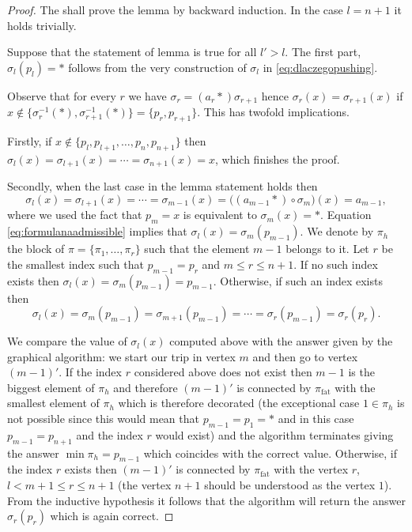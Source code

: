 \documentclass[12pt,dvips]{amsart}
\numberwithin{equation}{section} \numberwithin{figure}{section}
\theoremstyle{plain}
\theoremstyle{definition}
\theoremstyle{remark}
\newcommand{\xtra}{\ast}
\DeclareMathOperator{\fat}{fat}
\begin{document}
\begin{proof}
The shall prove the lemma by backward induction. In the case $l=n+1$
it holds trivially.

Suppose that the statement of lemma is true for all $l'>l$. The
first part, $\sigma_l(p_l)=\xtra$ follows from the very construction
of $\sigma_l$ in \eqref{eq:dlaczegopushing}.

Observe that for every $r$ we have $\sigma_r=(a_r\xtra)
\sigma_{r+1}$ hence $\sigma_r(x)=\sigma_{r+1}(x)$ if $x\notin\{
\sigma_{r}^{-1}(\xtra),
\sigma_{r+1}^{-1}(\xtra)\}=\{p_{r},p_{r+1}\}$. This has twofold
implications.

Firstly, if $x\notin\{p_l,p_{l+1},\dots,p_n,p_{n+1}\}$ then
$\sigma_l(x)=\sigma_{l+1}(x)=\cdots=\sigma_{n+1}(x)=x$, which
finishes the proof.

Secondly, when the last case in the lemma statement holds then
$$\sigma_l(x)=\sigma_{l+1}(x)=\cdots=\sigma_{m-1} (x)=
  \big((a_{m-1} \xtra)\circ \sigma_m\big)(x)=a_{m-1},$$
where we used the fact that $p_m=x$ is equivalent to
$\sigma_m(x)=\xtra$. Equation \eqref{eq:formulanaadmissible} implies
that $\sigma_l(x)=\sigma_{m}(p_{m-1})$. We denote by $\pi_h$ the
block of $\pi=\{\pi_1,\dots,\pi_r\}$ such that the element $m-1$
belongs to it. Let $r$ be the smallest index such that $p_{m-1}=p_r$
and $m\leq r\leq n+1$. If no such index exists then
$\sigma_l(x)=\sigma_{m}(p_{m-1})=p_{m-1}$. Otherwise, if such an
index exists then
$$\sigma_l(x)=\sigma_{m}(p_{m-1})=\sigma_{m+1}(p_{m-1})=\cdots=
\sigma_{r}(p_{m-1})=\sigma_{r}(p_r).$$

We compare the value of $\sigma_l(x)$ computed above with the answer
given by the graphical algorithm: we start our trip in vertex $m$
and then go to vertex $(m-1)'$. If the index $r$ considered above
does not exist then $m-1$ is the biggest element of $\pi_h$ and
therefore $(m-1)'$ is connected by $\pi_{\fat}$ with the smallest
element of $\pi_h$ which is therefore decorated (the exceptional
case $1\in \pi_h$ is not possible since this would mean that
$p_{m-1}=p_1=\xtra$ and in this case $p_{m-1}=p_{n+1}$ and the index
$r$ would exist) and the algorithm terminates giving the answer
$\min \pi_h=p_{m-1}$ which coincides with the correct value.
Otherwise, if the index $r$ exists then  $(m-1)'$ is connected by
$\pi_{\fat}$ with the vertex $r$, $l<m+1\leq r\leq n+1$ (the vertex
$n+1$ should be understood as the vertex $1$). From the inductive
hypothesis it follows that the algorithm will return the answer
$\sigma_{r}(p_r)$ which is again correct.
\end{proof}
\end{document}
